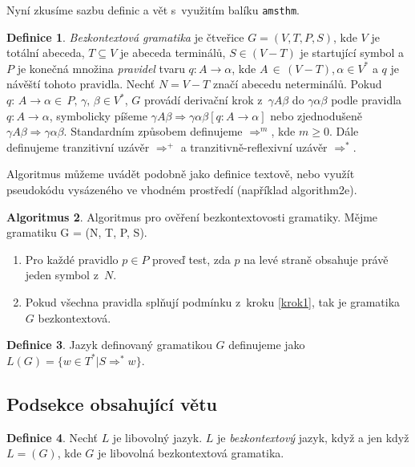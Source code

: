 \documentclass[11pt,a4paper,twocolumn]{article}
\theoremstyle{definition}
\newtheorem{defn}{Definice}[section]
\theoremstyle{lemma}
\newtheorem{algo}[defn]{Algoritmus}
\begin{document}
\indent Nyní zkusíme sazbu definic a vět s~využitím balíku \texttt{amsthm}.
\begin{defn} 
  \label{defn1}
  \textit{Bezkontextová gramatika} je čtveřice $G = (V,T,P,S)$, kde $V$ je totální abeceda,
  $T\!\subseteq\!V$ je abeceda terminálů, $S\!\in\!(V-T)$ je startující symbol a $P$ je konečná
  množina \textit{pravidel} tvaru $q\!: A\!\rightarrow\alpha$, kde 
  $A\,\in\,(V-T)$,$\,\alpha\in\!V^*$ a $q$ je návěští tohoto pravidla. Nechť $N=V-T$ značí 
  abecedu neterminálů. Pokud $q\!:\,A\rightarrow\alpha\in\,P,\,\gamma,\,\beta\in\!V^*$, $G$ 
  provádí derivační krok z~$\gamma A\beta$ do $\gamma\alpha\beta$ podle pravidla 
  $q\!: A \rightarrow \alpha$, symbolicky píšeme 
  $\gamma A\beta \Rightarrow \gamma\alpha\beta [q\!: A \rightarrow \alpha]$ nebo zjednodušeně
  $\gamma A\beta \Rightarrow \gamma\alpha\beta$. Standardním způsobem definujeme $\Rightarrow^m$,
  kde $m \geq 0$. Dále definujeme tranzitivní uzávěr $\Rightarrow^+$ a tranzitivně-reflexivní
  uzávěr $\Rightarrow^*$.
\end{defn}

Algoritmus můžeme uvádět podobně jako definice textově, nebo využít pseudokódu vysázeného ve vhodném prostředí (například algorithm2e).


\begin{algo} 
  \label{algo1}
  Algoritmus pro ověření bezkontextovosti gramatiky. Mějme gramatiku G = (N, T, P, S).
  \begin{enumerate}
    \item\label{krok1} Pro každé pravidlo $p\in P$ proveď test, zda $p$ na levé straně obsahuje
      právě jeden symbol z~$N$.
    \item\label{krok2} Pokud všechna pravidla splňují podmínku z~kroku \ref{krok1}, tak je
      gramatika $G$ bezkontextová.
  \end{enumerate}
\end{algo}

\begin{defn} 
  \label{defn2}
  Jazyk definovaný gramatikou $G$ definujeme jako $L(G)=\{w\in T^*|S\Rightarrow^*w\}$.
\end{defn}

\subsection{Podsekce obsahující větu}

\begin{defn} 
  \label{defn3}
  Nechť $L$ je libovolný jazyk. $L$ je {\itshape bezkontextový} jazyk, když a jen když $L=
  (G)$, kde $G$ je libovolná bezkontextová gramatika.
\end{defn}
\end{document}
